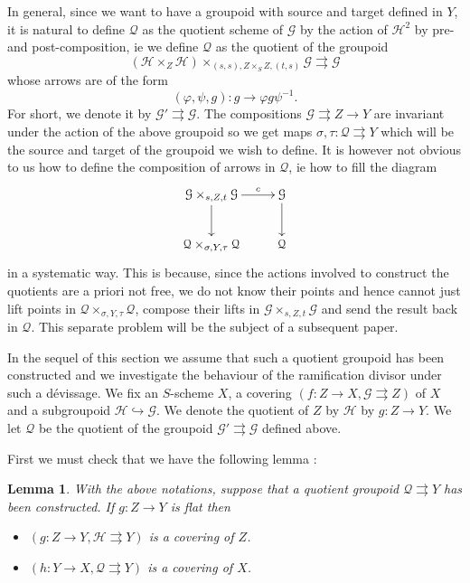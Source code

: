 \documentclass{amsart}
\newtheorem{lemm}{Lemma}[section]
\theoremstyle{definition}
\theoremstyle{remark}
\begin{document}
In general, since we want to have a groupoid with source and target defined in $Y$, it is natural to define ${{\mathcal Q}}$ as the quotient scheme of ${{\mathcal G}}$ by the action of ${{\mathcal H}}^2$ by pre- and post-composition, ie we define ${{\mathcal Q}}$ as the quotient of the groupoid \[ ({{\mathcal H}} \times_Z {{\mathcal H}}) \times_{(s,s),Z \times_S Z, (t,s)} {{\mathcal G}} {\rightrightarrows} {{\mathcal G}} \] whose arrows are of the form \[ (\varphi,\psi,g) : g {\longrightarrow} \varphi g  \psi^{-1}. \]
For short, we denote it by ${{\mathcal G}}' {\rightrightarrows} {{\mathcal G}}$. The compositions ${{\mathcal G}} {\rightrightarrows} Z {\longrightarrow} Y$ are invariant under the action of the above groupoid so we get maps $\sigma, \tau  : {{\mathcal Q}} {\rightrightarrows} Y$ which will be the source and target of the groupoid we wish to define. It is however not obvious to us how to define the composition of arrows in ${{\mathcal Q}}$, ie how to fill the diagram \[ \xymatrix{{{\mathcal G}} \times_{s,Z,t} {{\mathcal G}} \ar[r]^-c \ar[d] & {{\mathcal G}} \ar[d] \\ {{\mathcal Q}} \times_{\sigma,Y,\tau} {{\mathcal Q}} & {{\mathcal Q}} } \]  
in a systematic way. This is because, since the actions involved to construct the quotients are a priori not free, we do not know their points and hence cannot just lift points in ${{\mathcal Q}} \times_{\sigma,Y,\tau} {{\mathcal Q}}$, compose their lifts in ${{\mathcal G}} \times_{s,Z,t} {{\mathcal G}}$ and send the result back in ${{\mathcal Q}}$. This separate problem will be the subject of a subsequent paper. 

\medskip

 In the sequel of this section we assume that such a quotient groupoid has been constructed and we investigate the behaviour of the ramification divisor under such a d\'evissage. We fix an $S$-scheme $X$, a covering $(f : Z {\longrightarrow} X, {{\mathcal G}} {\rightrightarrows} Z)$ of $X$ and a subgroupoid ${{\mathcal H}} {\hookrightarrow} {{\mathcal G}}$. We denote the quotient of $Z$ by ${{\mathcal H}}$ by $g : Z {\longrightarrow} Y$. We let ${{\mathcal Q}}$ be the quotient of the groupoid ${{\mathcal G}}' {\rightrightarrows} {{\mathcal G}}$ defined above.    

First we must check that we have the following lemma : 

\begin{lemm}

With the above notations, suppose that a quotient groupoid ${{\mathcal Q}} {\rightrightarrows} Y$ has been constructed. If $ g : Z {\longrightarrow} Y$ is flat then 

\begin{itemize}

\item[(i)] $(g : Z {\longrightarrow} Y, {{\mathcal H}} {\rightrightarrows} Y)$ is a covering of $Z$.

\item[(ii)] $(h : Y {\longrightarrow} X, {{\mathcal Q}} {\rightrightarrows} Y)$ is a covering of $X$.

\end{itemize}

\end{lemm}
\end{document}
